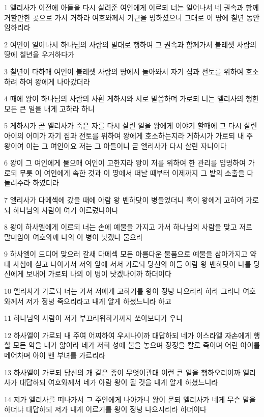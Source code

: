 \par 1 엘리사가 이전에 아들을 다시 살려준 여인에게 이르되 너는 일어나서 네 권속과 함께 거할만한 곳으로 가서 거하라 여호와께서 기근을 명하셨으니 그대로 이 땅에 칠년 동안 임하리라
\par 2 여인이 일어나서 하나님의 사람의 말대로 행하여 그 권속과 함께가서 블레셋 사람의 땅에 칠년을 우거하다가
\par 3 칠년이 다하매 여인이 블레셋 사람의 땅에서 돌아와서 자기 집과 전토를 위하여 호소하려 하여 왕에게 나아갔더라
\par 4 때에 왕이 하나님의 사람의 사환 게하시와 서로 말씀하며 가로되 너는 엘리사의 행한 모든 큰 일을 내게 고하라 하니
\par 5 게하시가 곧 엘리사가 죽은 자를 다시 살린 일을 왕에게 이야기 할때에 그 다시 살린 아이의 어미가 자기 집과 전토를 위하여 왕에게 호소하는지라 게하시가 가로되 내 주 왕이여 이는 그 여인이요 저는 그 아들이니 곧 엘리사가 다시 살린 자니이다
\par 6 왕이 그 여인에게 물으매 여인이 고한지라 왕이 저를 위하여 한 관리를 임명하여 가로되 무릇 이 여인에게 속한 것과 이 땅에서 떠날 때부터 이제까지 그 밭의 소출을 다 돌려주라 하였더라
\par 7 엘리사가 다메섹에 갔을 때에 아람 왕 벤하닷이 병들었더니 혹이 왕에게 고하여 가로되 하나님의 사람이 여기 이르렀나이다
\par 8 왕이 하사엘에게 이르되 너는 손에 예물을 가지고 가서 하나님의 사람을 맞고 저로 말미암아 여호와께 나의 이 병이 낫겠나 물으라
\par 9 하사엘이 드디어 맞으러 갈새 다메섹 모든 아름다운 물품으로 예물을 삼아가지고 약대 사십에 싣고 나아가서 저의 앞에 서서 가로되 당신의 아들 아람 왕 벤하닷이 나를 당신에게 보내어 가로되 나의 이 병이 낫겠나이까 하더이다
\par 10 엘리사가 가로되 너는 가서 저에게 고하기를 왕이 정녕 나으리라 하라 그러나 여호와께서 저가 정녕 죽으리라고 내게 알게 하셨느니라 하고
\par 11 하나님의 사람이 저가 부끄러워하기까지 쏘아보다가 우니
\par 12 하사엘이 가로되 내 주여 어찌하여 우시나이까 대답하되 네가 이스라엘 자손에게 행할 모든 악을 내가 앎이라 네가 저희 성에 불을 놓으며 장정을 칼로 죽이며 어린 아이를 메어차며 아이 밴 부녀를 가르리라
\par 13 하사엘이 가로되 당신의 개 같은 종이 무엇이관대 이런 큰 일을 행하오리이까 엘리사가 대답하되 여호와께서 네가 아람 왕이 될 것을 내게 알게 하셨느니라
\par 14 저가 엘리사를 떠나가서 그 주인에게 나아가니 왕이 묻되 엘리사가 네게 무슨 말을 하더냐 대답하되 저가 내게 이르기를 왕이 정녕 나으시리라 하더이다

